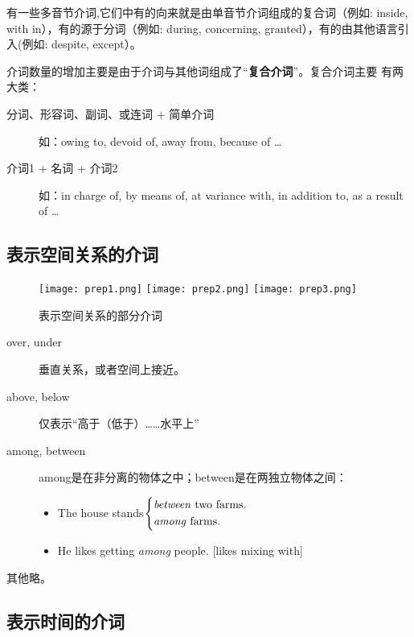 有一些多音节介词,它们中有的向来就是由单音节介词组成的复合词（例如: inside,
with in），有的源于分词（例如: during, concerning, granted），有的由其他语言引
入(例如: despite, except）。

介词数量的增加主要是由于介词与其他词组成了“\textbf{复合介词}”。复合介词主要
有两大类：
\begin{description}
\item[分词、形容词、副词、或连词 + 简单介词] 如：owing to, devoid of, away
  from, because of \ldots{}
\item[介词1 + 名词 + 介词2] 如：in charge of, by means of, at variance with,
  in addition to, as a result of \ldots{}
\end{description}

\subsection{表示空间关系的介词}

\begin{figure}[tp!]
  \centering
  \texttt{[image: prep1.png]}
  \texttt{[image: prep2.png]}
  \texttt{[image: prep3.png]}
  \caption{\label{fig:preppic}表示空间关系的部分介词}
\end{figure}

\begin{description}
\item[over, under] 垂直关系，或者空间上接近。

\item[above, below] 仅表示“高于（低于）……水平上”

\item[among, between] among是在非分离的物体之中；between是在两独立物体之间：
  \begin{itemize}
  \item The house stands$ \left\{
      \begin{aligned}
        &\text{\emph{between} two farms.} \\
        &\text{\emph{among} farms.}
      \end{aligned}
    \right. $

  \item He likes getting \emph{among} people. [likes mixing with]
  \end{itemize}

\end{description}

其他略。

\subsection{表示时间的介词}


